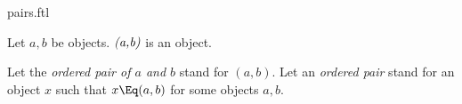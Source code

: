 \documentclass{stex}
\begin{document}
\begin{smodule}{pairs.ftl}



\begin{fakeforthel}
  \begin{signature}
    Let $a,b$ be objects.
    $\emph{(a,b)}$ is an object.
  \end{signature}
\end{fakeforthel}

\begin{forthel}
  \begin{convention}[for=ordered pair]
    Let the \emph{ordered pair of $a$ and $b$} stand for $(a,b)$.
    Let an \emph{ordered pair} stand for an object $x$ such that $x \Eq (a,b)$ for some objects $a, b$.
  \end{convention}
\end{forthel}

\end{smodule}
\end{document}
